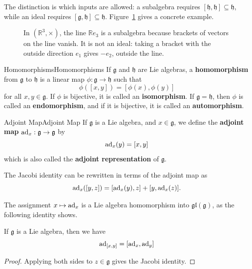 \documentclass[../main.tex]{subfiles}
\begin{document}
The distinction is which inputs are allowed: a subalgebra requires $[\mathfrak h,\mathfrak h]\subseteq\mathfrak h$, while an ideal requires $[\mathfrak g,\mathfrak h]\subseteq\mathfrak h$. Figure~\ref{fig:subalgebra-versus-ideal} gives a concrete example.

\begin{figure}[H]
    \centering
    \caption{In $(\mathbb R^3,\times)$, the line $\mathbb Re_3$ is a subalgebra because brackets of vectors on the line vanish. It is not an ideal: taking a bracket with the outside direction $e_1$ gives $-e_2$, outside the line.}
    \label{fig:subalgebra-versus-ideal}
\end{figure}

\begin{definition}{Homomorphisms}{Homomorphisms}
  If $\mathfrak{g}$ and $\mathfrak{h}$ are Lie algebras, a \textbf{homomorphism} from $\mathfrak{g}$ to $\mathfrak{h}$ is a linear map $\phi:\mathfrak{g}\to\mathfrak{h}$ such that
  \begin{equation}
    \phi([x,y])=[\phi(x),\phi(y)]
  \end{equation}
  for all $x,y\in\mathfrak{g}$. If $\phi$ is bijective, it is called an \textbf{isomorphism}. If $\mathfrak{g}=\mathfrak{h}$, then $\phi$ is called an \textbf{endomorphism}, and if it is bijective, it is called an \textbf{automorphism}.
\end{definition}

\begin{definition}{Adjoint Map}{Adjoint Map}
  If $\mathfrak{g}$ is a Lie algebra, and $x \in \mathfrak{g}$, we define the \textbf{adjoint map} $\operatorname{ad}_x:\mathfrak{g}\to\mathfrak{g}$ by
  \begin{equation}
    \operatorname{ad}_x(y)=[x,y]
  \end{equation}
  which is also called the \textbf{adjoint representation} of $\mathfrak{g}$.
\end{definition}
The Jacobi identity can be rewritten in terms of the adjoint map as
\begin{equation}
  \operatorname{ad}_x([y,z])=[\operatorname{ad}_x(y),z]+[y,\operatorname{ad}_x(z)].
\end{equation}

The assignment $x\mapsto\operatorname{ad}_x$ is a Lie algebra homomorphism into $\mathfrak{gl}(\mathfrak{g})$, as the following identity shows.

\begin{proposition}{}{}
  If $\mathfrak{g}$ is a Lie algebra, then we have
  \begin{equation}
    \operatorname{ad}_{[x,y]}=[\operatorname{ad}_x,\operatorname{ad}_y]
  \end{equation}
\end{proposition}
\begin{proof}
  Applying both sides to $z\in\mathfrak{g}$ gives the Jacobi identity.
\end{proof}
\end{document}
